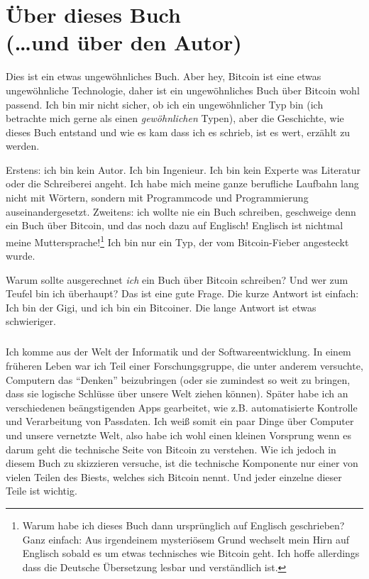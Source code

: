
\def\bitcoinB{\leavevmode
  {\setbox0=\hbox{\textsf{B}}%
    \dimen0\ht0 \advance\dimen0 0.2ex
    \ooalign{\hfil \box0\hfil\cr
      \hfil\vrule height \dimen0 depth.2ex\hfil\cr
    }%
  }%
}

\chapter*{Über dieses Buch \\ (\ldots und über den Autor)}

Dies ist ein etwas ungewöhnliches Buch. Aber hey, Bitcoin ist eine etwas
ungewöhnliche Technologie, daher ist ein ungewöhnliches Buch über Bitcoin wohl
passend. Ich bin mir nicht sicher, ob ich ein ungewöhnlicher Typ bin (ich
betrachte mich gerne als einen \textit{gewöhnlichen} Typen), aber die
Geschichte, wie dieses Buch entstand und wie es kam dass ich es schrieb, ist es
wert, erzählt zu werden.

Erstens: ich bin kein Autor. Ich bin Ingenieur. Ich bin kein Experte was
Literatur oder die Schreiberei angeht. Ich habe mich meine ganze berufliche
Laufbahn lang nicht mit Wörtern, sondern mit Programmcode und Programmierung
auseinandergesetzt. Zweitens: ich wollte nie ein Buch schreiben, geschweige denn
ein Buch über Bitcoin, und das noch dazu auf Englisch! Englisch ist nichtmal
meine Muttersprache!\footnote{Warum habe ich dieses Buch dann ursprünglich auf
Englisch geschrieben? Ganz einfach: Aus irgendeinem mysteriösem Grund wechselt
mein Hirn auf Englisch sobald es um etwas technisches wie Bitcoin geht. Ich
hoffe allerdings dass die Deutsche Übersetzung lesbar und verständlich ist.} Ich
bin nur ein Typ, der vom Bitcoin-Fieber angesteckt wurde.

Warum sollte ausgerechnet \textit{ich} ein Buch über Bitcoin schreiben? Und wer
zum Teufel bin ich überhaupt? Das ist eine gute Frage. Die kurze Antwort ist
einfach: Ich bin der Gigi, und ich bin ein Bitcoiner. Die lange Antwort ist
etwas schwieriger.

\paragraph{}
Ich komme aus der Welt der Informatik und der Softwareentwicklung. In einem
früheren Leben war ich Teil einer Forschungsgruppe, die unter anderem versuchte,
Computern das \enquote{Denken} beizubringen (oder sie zumindest so weit zu
bringen, dass sie logische Schlüsse über unsere Welt ziehen können). Später habe
ich an verschiedenen beängstigenden Apps gearbeitet, wie z.B. automatisierte
Kontrolle und Verarbeitung von Passdaten. Ich weiß somit ein paar Dinge über
Computer und unsere vernetzte Welt, also habe ich wohl einen kleinen Vorsprung
wenn es darum geht die technische Seite von Bitcoin zu verstehen. Wie ich jedoch
in diesem Buch zu skizzieren versuche, ist die technische Komponente nur einer
von vielen  Teilen des Biests, welches sich Bitcoin nennt. Und jeder einzelne
dieser Teile ist wichtig.

